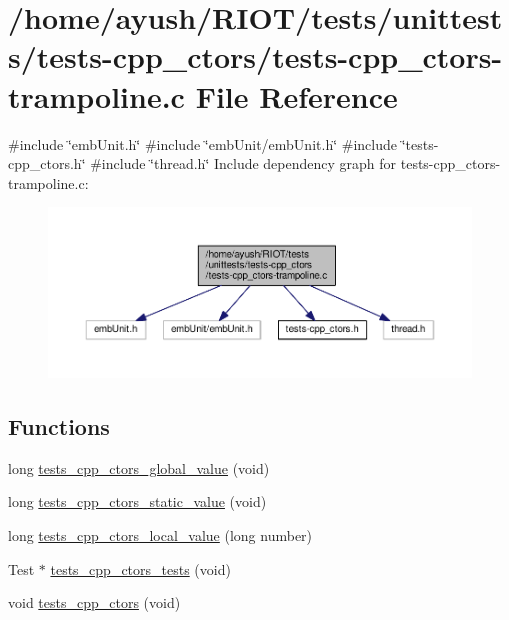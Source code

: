 \hypertarget{tests-cpp__ctors-trampoline_8c}{}\section{/home/ayush/\+R\+I\+O\+T/tests/unittests/tests-\/cpp\+\_\+ctors/tests-\/cpp\+\_\+ctors-\/trampoline.c File Reference}
\label{tests-cpp__ctors-trampoline_8c}
{\ttfamily \#include \char`\"{}emb\+Unit.\+h\char`\"{}}\newline
{\ttfamily \#include \char`\"{}emb\+Unit/emb\+Unit.\+h\char`\"{}}\newline
{\ttfamily \#include \char`\"{}tests-\/cpp\+\_\+ctors.\+h\char`\"{}}\newline
{\ttfamily \#include \char`\"{}thread.\+h\char`\"{}}\newline
Include dependency graph for tests-\/cpp\+\_\+ctors-\/trampoline.c\+:
\nopagebreak
\begin{figure}[H]
\begin{center}
\leavevmode
\includegraphics[width=350pt]{tests-cpp__ctors-trampoline_8c__incl}
\end{center}
\end{figure}
\subsection*{Functions}
\begin{DoxyCompactItemize}
\item 
long \hyperlink{tests-cpp__ctors-trampoline_8c_abe68002aa60f5430c49e9a60c833204a}{tests\+\_\+cpp\+\_\+ctors\+\_\+global\+\_\+value} (void)
\item 
long \hyperlink{tests-cpp__ctors-trampoline_8c_ab8822beb2f4902d29d43fcf2a5d4ba38}{tests\+\_\+cpp\+\_\+ctors\+\_\+static\+\_\+value} (void)
\item 
long \hyperlink{tests-cpp__ctors-trampoline_8c_aad38fa1069336f72bf5d32e951847f96}{tests\+\_\+cpp\+\_\+ctors\+\_\+local\+\_\+value} (long number)
\item 
Test $\ast$ \hyperlink{tests-cpp__ctors-trampoline_8c_ab1745dfec29f037bb55e42e47f27f635}{tests\+\_\+cpp\+\_\+ctors\+\_\+tests} (void)
\item 
void \hyperlink{tests-cpp__ctors-trampoline_8c_a36528c92944d8c70691edea0e08ac2af}{tests\+\_\+cpp\+\_\+ctors} (void)
\end{DoxyCompactItemize}
